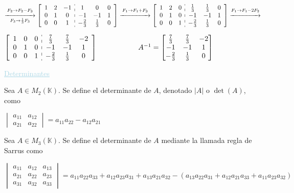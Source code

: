 \documentclass[12pt]{article}
\DeclareMathOperator{\dt}{det}
\begin{document}
$\overset{F_2\rightarrow F_2-F_3}{\underset{F_3\rightarrow
\frac{1}{3}F_3}{\xrightarrow{\hspace{1.5cm}}}}\left[\begin{array}{ccc:ccc}
1 & 2 & -1 & 1 & 0 & 0 \\ 
0 & 1 & 0 & -1 & -1 & 1 \\ 
0 & 0 & 1 & -\textstyle\frac{2}{3} & \textstyle\frac{1}{3} & 0
\end{array} \right]\overset{F_1\rightarrow
F_1+F_3}{\xrightarrow{\hspace{1.5cm}}}\left[\begin{array}{ccc:ccc}
1 & 2 & 0 & \textstyle\frac{1}{3} & \textstyle\frac{1}{3} & 0 \\0 & 1 & 0 & -1 & -1 & 1 \\ 
0 & 0 & 1 & -\textstyle\frac{2}{3} & \textstyle\frac{1}{3} & 0
\end{array} \right]\overset{F_1\rightarrow
F_1-2F_2}{\xrightarrow{\hspace{1.5cm}}}$

$\left[\begin{array}{ccc:ccc}
1 & 0 & 0 & \textstyle\frac{7}{3} & \textstyle\frac{7}{3} & -2
\\
0 & 1 & 0 & -1 & -1 & 1 \\ 
0 & 0 & 1 & -\textstyle\frac{2}{3} & \textstyle\frac{1}{3} & 0
\end{array} \right]\hspace{2cm}A^{-1}=\begin{bmatrix}
\textstyle\frac{7}{3} & \textstyle\frac{7}{3} & -2 \\ 
-1 & -1 & 1 \\ 
-\textstyle\frac{2}{3} & \textstyle\frac{1}{3} & 0
\end{bmatrix} $

\textcolor{lightblue}{\underline{Determinantes}}

Sea $A\in M_2(\mathbb{K})$. Se define el determinante de $A$,
denotado $|A|$ o $\dt(A)$, como

$\begin{vmatrix}
a_{11} & a_{12} \\ 
a_{21} & a_{22}
\end{vmatrix}=a_{11}a_{22}-a_{12}a_{21}$

Sea $A\in M_3(\mathbb{K})$. Se define el determinante de $A$
mediante la llamada regla de Sarrus como

$\begin{vmatrix}
a_{11} & a_{12} & a_{13} \\ 
a_{21} & a_{22} & a_{23} \\ 
a_{31} & a_{32} & a_{33}
\end{vmatrix}=a_{11}a_{22}a_{33}+a_{12}a_{23}a_{31}+a_{13}a_{21}a_{32}-\left(a_{13}a_{22}a_{31}+a_{12}a_{21}a_{33}+a_{11}a_{23}a_{32}\right)$
\end{document}

